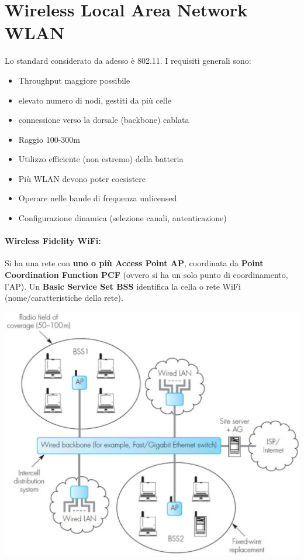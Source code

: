 
\section{Wireless Local Area Network WLAN}
Lo standard considerato da adesso è 802.11. I requisiti generali sono: 
\begin{itemize}
	\item Throughput maggiore possibile
	\item elevato numero di nodi, gestiti da più celle
	\item connessione verso la dorsale (backbone) cablata
	\item Raggio 100-300m
	\item Utilizzo efficiente (non estremo) della batteria
	\item Più WLAN devono poter coesistere
	\item Operare nelle bande di frequenza unlicensed
	\item Configurazione dinamica (selezione canali, autenticazione)
\end{itemize}

\paragraph{Wireless Fidelity WiFi:} Si ha una rete con \textbf{uno o più Access Point AP}, coordinata da \textbf{Point Coordination Function PCF} (ovvero si ha un solo punto di coordinamento, l'AP). Un \textbf{Basic Service Set BSS} identifica la cella o rete WiFi (nome/caratteristiche della rete).
\begin{center}
	\includegraphics[width=0.7\linewidth]{img/wlan/wifistruct1}
\end{center}

